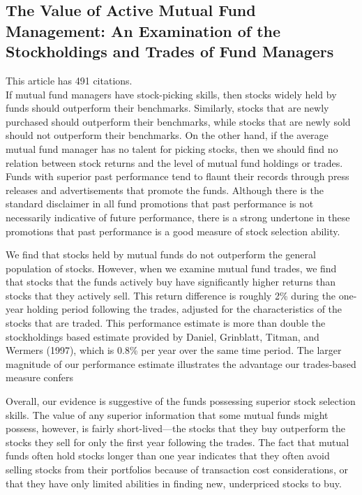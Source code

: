 \documentclass[12 pt]{article}
\begin{document}
\subsection{The Value of Active Mutual Fund Management: An Examination of the Stockholdings and Trades of Fund Managers}
This article has 491 citations.\\
If mutual fund managers have stock-picking skills, then stocks widely held by funds should outperform their benchmarks. Similarly, stocks that are newly purchased should outperform their benchmarks, while stocks that are newly sold should not outperform their benchmarks. On the other hand, if the average mutual fund manager has no talent for picking stocks, then we should find no relation between stock returns and the level of mutual fund holdings or trades. Funds with superior past performance tend to flaunt their records through
press releases and advertisements that promote the funds. Although there is the standard disclaimer in all fund promotions that past performance is not necessarily indicative of future performance, there is a strong undertone in these promotions that past performance is a good measure of stock selection ability.
\par We find that stocks held by mutual funds do not outperform the general population of stocks. However, when we examine mutual fund trades, we find that stocks that the funds actively buy have significantly higher returns than stocks that they actively sell. This return difference is roughly 2\% during the one-year holding period following the trades, adjusted for the characteristics of the stocks that are traded. This performance estimate is more than double the stockholdings based estimate provided by Daniel, Grinblatt, Titman, and Wermers (1997), which is 0.8\% per year over the same time period. The larger magnitude of our performance estimate illustrates the advantage our trades-based measure confers
\par Overall, our evidence is suggestive of the funds possessing superior stock selection skills. The value of any superior information that some mutual funds might possess, however, is fairly short-lived—the stocks that they buy outperform the stocks they sell for only the first year following the trades. The fact that mutual funds often hold stocks longer than one year indicates that they often avoid selling stocks from their portfolios because of transaction cost considerations, or that they have only limited abilities in finding new, underpriced stocks to buy.
\end{document}
